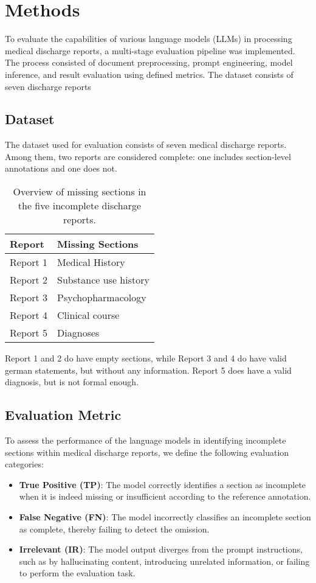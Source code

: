 \section{Methods}

To evaluate the capabilities of various language models (LLMs) in 
processing medical discharge reports, a multi-stage evaluation pipeline 
was implemented. The process consisted of document preprocessing, 
prompt engineering, model inference, and result evaluation using defined metrics.
The dataset consists of seven discharge reports

\subsection{Dataset}
The dataset used for evaluation consists of seven medical discharge reports. 
Among them, two reports are considered complete: one includes section-level 
annotations and one does not. 
\begin{table}[H]
\centering
\begin{tabular}{l l}
\toprule
\textbf{Report} & \textbf{Missing Sections} \\
\midrule
Report 1 & Medical History \\
Report 2 & Substance use history \\
Report 3 & Psychopharmacology \\
Report 4 & Clinical course \\
Report 5 & Diagnoses \\
\bottomrule
\end{tabular}
\caption{Overview of missing sections in the five incomplete discharge reports.}
\label{tab:missing_sections}
\end{table}
Report 1 and 2 do have empty sections, while Report 3 and 4 do have valid
german statements, but without any information. Report 5 does have a valid
diagnosis, but is not formal enough.

\subsection{Evaluation Metric}
To assess the performance of the language models in identifying incomplete sections within medical discharge reports, we define the following evaluation categories:
\begin{itemize}
  \item \textbf{True Positive (TP)}: The model correctly identifies a section as incomplete when it is indeed missing or insufficient according to the reference annotation.
  \item \textbf{False Negative (FN)}: The model incorrectly classifies an incomplete section as complete, thereby failing to detect the omission.
  \item \textbf{Irrelevant (IR)}: The model output diverges from the prompt instructions, such as by hallucinating content, introducing unrelated information, or failing to perform the evaluation task.
\end{itemize}

